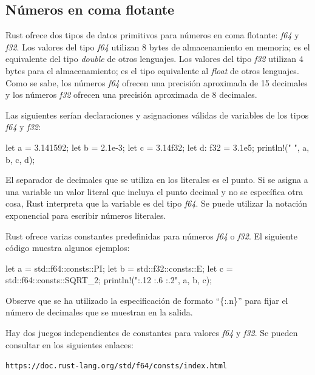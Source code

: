 \subsection{Números en coma flotante}
\noindent Rust ofrece dos tipos de datos primitivos para números en coma flotante: \textit{f64} y \textit{f32}. Los valores del tipo \textit{f64} utilizan 8 bytes de almacenamiento en memoria; es el equivalente del tipo \textit{double} de otros lenguajes. Los valores del tipo \textit{f32} utilizan 4 bytes para el almacenamiento; es el tipo equivalente al \textit{float} de otros lenguajes. Como se sabe, los números \textit{f64} ofrecen una precisión aproximada de 15 decimales y los números \textit{f32} ofrecen una precisión aproximada de 8 decimales.

Las siguientes serían declaraciones y asignaciones válidas de variables de los tipos \textit{f64} y \textit{f32}:

\vspace{0.7em}
\begin{Codigo}
let a = 3.141592;
let b = 2.1e-3;
let c = 3.14f32;
let d: f32 = 3.1e5;
println!("{} {} {} {}", a, b, c, d);
\end{Codigo}
\vspace{1em}

El separador de decimales que se utiliza en los literales es el punto. Si se asigna a una variable un valor literal que incluya el punto decimal y no se específica otra cosa, Rust interpreta que la variable es del tipo \textit{f64}. Se puede utilizar la notación exponencial para escribir números literales.

Rust ofrece varias constantes predefinidas para números \textit{f64} o \textit{f32}. El siguiente código muestra algunos ejemplos:

\vspace{0.7em}
\begin{Codigo}
let a = std::f64::consts::PI;
let b = std::f32::consts::E;
let c = std::f64::consts::SQRT_2;
println!("{:.12} {:.6} {:.2}", a, b, c);
\end{Codigo}

Observe que se ha utilizado la especificación de formato ``\{:.n\}'' para fijar el número de decimales que se muestran en la salida. 

Hay dos juegos independientes de constantes para valores \textit{f64} y \textit{f32}. Se pueden consultar en los siguientes enlaces:

{\centering \texttt{https://doc.rust-lang.org/std/f64/consts/index.html} \par}   


